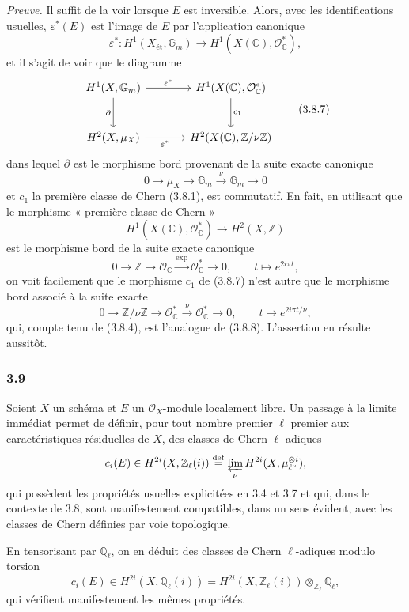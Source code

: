 \documentclass[11pt]{article}
\begin{document}
\emph{Preuve.} Il suffit de la voir lorsque $E$ est inversible. Alors, avec les identifications usuelles, $\varepsilon^*(E)$ est l'image de $E$ par l'application canonique
\[
\varepsilon^*:H^1(X_{\mathrm{ét}},\mathbb G_m)\to H^1(X(\mathbb C),\mathcal O_\mathbb C^*),
\tag{3.8.6}
\]
et il s'agit de voir que le diagramme
\[
\begin{tikzcd}[column sep=large,row sep=large]
H^1(X,\mathbb G_m) \arrow[r,"\varepsilon^*"] \arrow[d,"\partial"'] &
H^1(X(\mathbb C),\mathcal O_\mathbb C^*) \arrow[d,"c_1"]\\
H^2(X,\mu_X) \arrow[r,"\varepsilon^*"'] &
H^2(X(\mathbb C),\mathbb Z/\nu\mathbb Z)
\end{tikzcd}
\tag{3.8.7}
\]
dans lequel $\partial$ est le morphisme bord provenant de la suite exacte canonique
\[
0\to \mu_X\to\mathbb G_m\xrightarrow{\nu}\mathbb G_m\to0
\tag{3.8.8}
\]
et $c_1$ la première classe de Chern (3.8.1), est commutatif. En fait, en utilisant que le morphisme « première classe de Chern »
\[
H^1(X(\mathbb C),\mathcal O_\mathbb C^*)\to H^2(X,\mathbb Z)
\]
est le morphisme bord de la suite exacte canonique
\[
0\to\mathbb Z\to\mathcal O_\mathbb C\xrightarrow{\exp}\mathcal O_\mathbb C^*\to0,
\qquad
t\mapsto e^{2i\pi t},
\]
on voit facilement que le morphisme $c_1$ de (3.8.7) n'est autre que le morphisme bord associé à la suite exacte
\[
0\to\mathbb Z/\nu\mathbb Z\to\mathcal O_\mathbb C^*\xrightarrow{\nu}\mathcal O_\mathbb C^*\to0,
\qquad
t\mapsto e^{2i\pi t/\nu},
\]
qui, compte tenu de (3.8.4), est l'analogue de (3.8.8). L'assertion en résulte aussitôt.

\subsubsection*{3.9}
Soient $X$ un schéma et $E$ un $\mathcal O_X$-module localement libre. Un passage à la limite immédiat permet de définir, pour tout nombre premier $\ell$ premier aux caractéristiques résiduelles de $X$, des classes de Chern $\ell$-adiques
\[
c_i(E)\in H^{2i}(X,\mathbb Z_\ell(i))
\stackrel{\mathrm{def}}{=}\varprojlim_\nu H^{2i}(X,\mu_{\ell^\nu}^{\otimes i}),
\]
qui possèdent les propriétés usuelles explicitées en 3.4 et 3.7 et qui, dans le contexte de 3.8, sont manifestement compatibles, dans un sens évident, avec les classes de Chern définies par voie topologique.

En tensorisant par $\mathbb Q_\ell$, on en déduit des classes de Chern $\ell$-adiques modulo torsion
\[
c_i(E)\in H^{2i}(X,\mathbb Q_\ell(i))
=H^{2i}(X,\mathbb Z_\ell(i))\otimes_{\mathbb Z_\ell}\mathbb Q_\ell,
\]
qui vérifient manifestement les mêmes propriétés.
\end{document}
